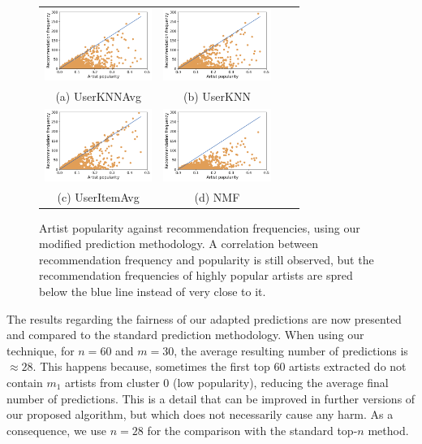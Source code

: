 \documentclass{article}
\begin{document}
\begin{figure}[!ht]
\centering
\begin{tabular}{cccc}
  \includegraphics[width=35mm]{img/sampl_modif_2_UserKNNAvg.png} &   \includegraphics[width=35mm]{img/sampl_modif_2_UserKNN.png} \\
(a) UserKNNAvg & (b) UserKNN  \\[6pt]

  \includegraphics[width=35mm]{img/sampl_modif_2_UserItemAvg.png} &  
  \includegraphics[width=35mm]{img/sampl_modif_2_NMF.png} \\
(c) UserItemAvg & (d) NMF \\[6pt]
\end{tabular}
\caption{Artist popularity against recommendation frequencies, using our modified prediction methodology.
A correlation between recommendation frequency and popularity is still observed, but the recommendation frequencies of highly popular artists
are spred below the blue line instead of very close to it.}
\label{fig:adap}
\end{figure}



The results regarding the fairness of our adapted 
predictions are now presented and compared to the standard
prediction methodology. When using our technique, 
for $n = 60$ and $m = 30$, the average resulting 
number of predictions is $\approx 28$. This happens because, 
sometimes the first top 60 artists extracted do not contain
$m_1$ artists from cluster 0 (low popularity),
reducing the average final number of predictions. 
This is a detail that can be improved in further
versions of our proposed algorithm, but which does
not necessarily cause any harm. As a consequence, 
we use $n = 28$ for the comparison with the standard 
top-$n$ method. 
\end{document}
